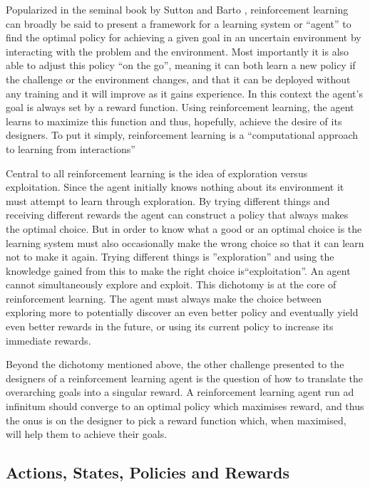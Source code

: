 Popularized in the seminal book by Sutton and Barto \cite{sutton_barto}, reinforcement learning can broadly be said to present a framework for a learning system or “agent” to find the optimal policy for achieving a given goal in an uncertain environment by interacting with the problem and the environment. Most importantly it is also able to adjust this policy ``on the go'', meaning it can both learn a new policy if the challenge or the environment changes, and that it can be deployed without any training and it will improve as it gains experience. In this context the agent's goal is always set by a reward function. Using reinforcement learning, the agent learns to maximize this function and thus, hopefully, achieve the desire of its designers. To put it simply, reinforcement learning is a “computational approach to learning from interactions” \cite{sutton_barto}

Central to all reinforcement learning is the idea of exploration versus exploitation. Since the agent initially knows nothing about its environment it must attempt  to learn through exploration. By trying different things and receiving different rewards the agent can construct a policy that always makes the optimal choice. But in order to know what a good or an optimal choice is the learning system must also occasionally make the wrong choice so that it can learn not to make it again. Trying different things is ''exploration'' and using the knowledge gained from this to make the right choice is``exploitation''. An agent cannot simultaneously explore and exploit. This dichotomy is at the core of reinforcement learning. The agent must always make the choice between exploring more to potentially discover an even better policy and eventually yield even better rewards in the future, or using its current policy to increase its immediate rewards.

Beyond the dichotomy mentioned above, the other challenge presented to the designers of a reinforcement learning agent is the question of how to translate the overarching goals into a singular reward. A reinforcement learning agent run ad infinitum should converge to an optimal policy which maximises reward, and thus the onus is on the designer to pick a reward function which, when maximised, will help them to achieve their goals. 

\subsection{Actions, States, Policies and Rewards}
\label{subsec:agent}

